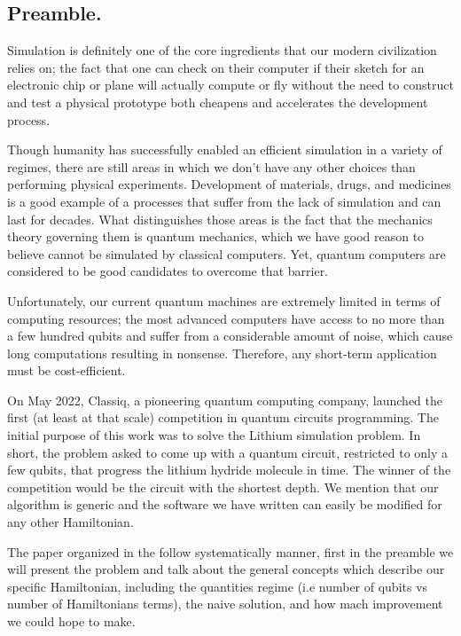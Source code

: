 \documentclass{article}
\begin{document}
\begin{multicols}{2}

\section{Preamble.}
Simulation is definitely one of the core ingredients that our modern civilization relies on; the fact that one can check on their computer if their sketch for an electronic chip or plane will actually compute or fly without the need to construct and test a physical prototype both cheapens and accelerates the development process. 

Though humanity has successfully enabled an efficient simulation in a variety of regimes, there are still areas in which we don't have any other choices than performing physical experiments. Development of materials, drugs, and medicines is a good example of a processes that suffer from the lack of simulation and can last for decades. What distinguishes those areas is the fact that the mechanics theory governing them is quantum mechanics, which we have good reason to believe cannot be simulated by classical computers. Yet, quantum computers are considered to be good candidates to overcome that barrier. 

Unfortunately, our current quantum machines are extremely limited in terms of computing resources; the most advanced computers have access to no more than a few hundred qubits and suffer from a considerable amount of noise, which cause long computations resulting in nonsense. Therefore, any short-term application must be cost-efficient.

On May 2022, Classiq, a pioneering quantum computing company, launched the first (at least at that scale) competition in quantum circuits programming. The initial purpose of this work was to solve the Lithium simulation problem. In short, the problem asked to come up with a quantum circuit, restricted to only a few qubits, that progress the lithium hydride molecule in time. The winner of the competition would be the circuit with the shortest depth. We mention that our algorithm is generic and the software we have written can easily be modified for any other Hamiltonian.

The paper organized in the follow systematically manner, first in the preamble we will present the problem and talk about the general concepts which describe our specific Hamiltonian, including the quantities regime (i.e number of qubits vs number of Hamiltonians terms), the naive solution, and how mach improvement we could hope to make.     



\end{multicols}
\end{document}
